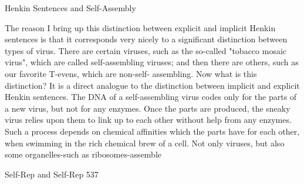 {                            Henkin Sentences and Self-Assembly

The reason I bring up this distinction between explicit and implicit Henkin sentences is that it
corresponds very nicely to a significant distinction between types of virus. There are certain
viruses, such as the so-called "tobacco mosaic virus", which are called self-assembling
viruses; and then there are others, such as our favorite T-evens, which are non-self-
assembling. Now what is this distinction? It is a direct analogue to the distinction between
implicit and explicit Henkin sentences.
        The DNA of a self-assembling virus codes only for the parts of a new virus, but not
for any enzymes. Once the parts are produced, the sneaky virus relies upon them to link up to
each other without help from any enzymes. Such a process depends on chemical affinities
which the parts have for each other, when swimming in the rich chemical brew of a cell. Not
only viruses, but also some organelles-such as ribosomes-assemble




Self-Rep and Self-Rep                                                                        537

}
